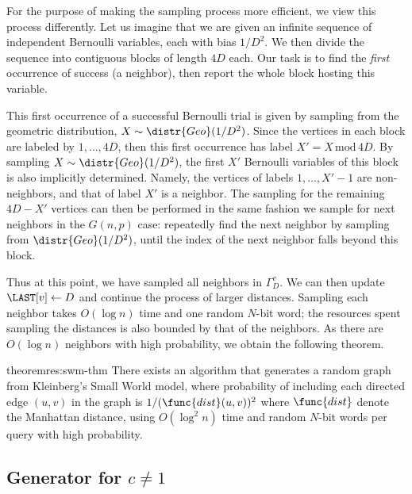 For the purpose of making the sampling process more efficient, we view this process differently. Let us imagine that we are given an infinite sequence of independent Bernoulli variables, each with bias $1/D^2$.
We then divide the sequence into contiguous blocks of length $4D$ each.
Our task is to find the \emph{first} occurrence of success (a neighbor), then report the whole block hosting this variable.

This first occurrence of a successful Bernoulli trial is given by sampling from the geometric distribution, $X\sim\distr{Geo}(1/D^2)$.
Since the vertices in each block are labeled by $1, \ldots, 4D$, then this first occurrence has label $X' = {X\mathrm{\,mod\,}4D}$.
By sampling $X\sim\distr{Geo}(1/D^2)$, the first $X'$ Bernoulli variables of this block is also implicitly determined. Namely, the vertices of labels $1, \ldots, X'-1$ are non-neighbors, and that of label $X'$ is a neighbor.
The sampling for the remaining $4D-X'$ vertices can then be performed in the same fashion we sample for next neighbors in the $G(n,p)$ case: 
repeatedly find the next neighbor by sampling from $\distr{Geo}(1/D^2)$, until the index of the next neighbor falls beyond this block.

Thus at this point, we have sampled all neighbors in $\Gamma_D^v$. We can then update $\LAST[v] \leftarrow D$ and continue the process of larger distances.
Sampling each neighbor takes $O(\log n)$ time and one random $N$-bit word; the resources spent sampling the distances is also bounded by that of the neighbors.
As there are $O(\log n)$ neighbors with high probability, we obtain the following theorem.

\begin{restatable}{theorem}{res:swm-thm}\label{thm-swm}
There exists an algorithm that generates a random graph from Kleinberg's Small World model, where probability of including each directed edge $(u,v)$ in the graph is $1/(\func{dist}(u,v))^2$ where $\func{dist}$ denote the Manhattan distance,
using $O(\log^2 n)$ time and random $N$-bit words per  query with high probability.
\end{restatable}

\subsection{Generator for $c \neq 1$}

